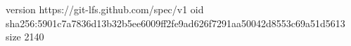 version https://git-lfs.github.com/spec/v1
oid sha256:5901c7a7836d13b32b5ee6009ff2fe9ad626f7291aa50042d8553c69a51d5613
size 2140
